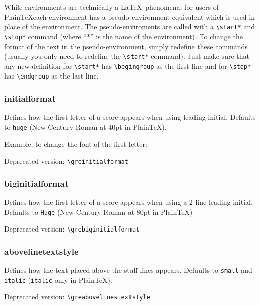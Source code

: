 While environments are technically a \LaTeX\ phenomena, for users of
Plain\TeX each environment has a pseudo-environment equivalent which is
used in place of the environment.  The pseudo-enviroments are called
with a \verb=\start*= and \verb=\stop*= command (where ``*'' is the
name of the environment).  To change the format of the text in the
pseudo-environment, simply redefine these commands (usually you only
need to redefine the \verb=\start*= command).  Just make sure that any
new definition for \verb=\start*= has \verb=\begingroup= as the first
line and for \verb=\stop*= has \verb=\endgroup= as the last line.

\subsubsection*{initialformat}
Defines how the first letter of a score appears when using leading
initial.  Defaults to \verb=huge= (New Century Roman at 40pt in
Plain\TeX).

Example, to change the font of the first letter:

\begin{latexcode}
  \renewenvironment*{initialformat}{\fontfamily{ppl}\selectfont\huge}{}
\end{latexcode}

\smallskip\hskip 15pt Deprecated version: \verb=\greinitialformat=

\subsubsection*{biginitialformat}
Defines how the first letter of a score appears when using a 2-line
leading initial.  Defaults to \verb=Huge= (New Century Roman at 80pt
in Plain\TeX)

\smallskip\hskip 15pt Deprecated version: \verb=\grebiginitialformat=

\subsubsection*{abovelinetextstyle}
Defines how the text placed above the staff lines appears.  Defaults
to \verb=small= and \verb=italic= (\verb=italic= only in Plain\TeX).

\smallskip\hskip 15pt Deprecated version: \verb=\greabovelinestextstyle=

